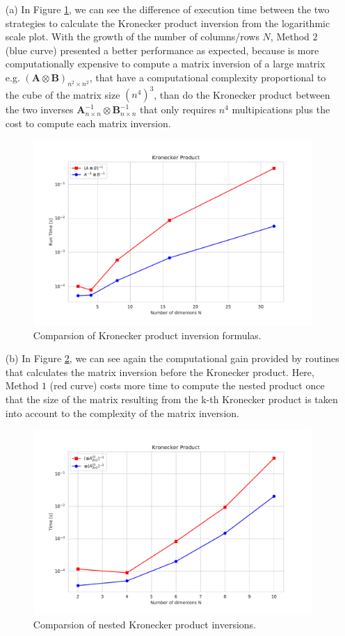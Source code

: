 \documentclass[12pt]{article}
\begin{document}
\begin{itemize}
    \item [(a)] In Figure \ref{invkron}, we can see the 
difference of execution time between the two strategies to calculate the 
Kronecker product inversion from the logarithmic scale plot. With the growth 
of the number of columns/rows $N$, Method $2$ (blue curve) presented a better 
performance as expected, because is more computationally expensive 
to compute a matrix inversion of a large matrix e.g. 
$(\bm{A} \otimes \bm{B})_{n^2 \times n^2 }$, that have a computational complexity 
proportional to the cube of the matrix size $(n^4)^3$, than do the Kronecker product 
between the two inverses 
$\bm{A}^{-1}_{n\times n} \otimes \bm{B}^{-1}_{n\times n}$ that only requires 
$n^4$ multipications plus the cost to compute each matrix inversion. 

\begin{figure}[!ht]
    \centering 
    \includegraphics[width=0.65\linewidth]{figs/invkron.pdf}
    \caption{Comparsion of Kronecker product inversion formulas.}
    \label{invkron}
\end{figure}

    \item [(b)] In Figure \ref{nkron}, we can see again the computational gain 
provided by routines that calculates the matrix inversion before the Kronecker 
product. Here, Method $1$ (red curve) costs more time to compute the nested 
product once that the size of the matrix resulting from the k-th Kronecker 
product is taken into account to the complexity of the matrix inversion.

\begin{figure}[H]
    \centering 
    \includegraphics[width=0.65\linewidth]{figs/ninvkron.pdf}
    \caption{Comparsion of nested Kronecker product inversions.}
    \label{nkron}
\end{figure}

\end{itemize}
\end{document}
